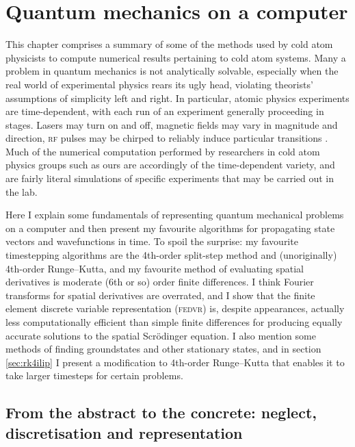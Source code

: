 \chapter{Quantum mechanics on a computer}

This chapter comprises a summary of some of the methods used by cold atom physicists to compute numerical results pertaining to cold atom systems. Many a problem in quantum mechanics is not analytically solvable, especially when the real world of experimental physics rears its ugly head, violating theorists' assumptions of simplicity left and right. In particular, atomic physics experiments are time-dependent, with each run of an experiment generally proceeding in stages. Lasers may turn on and off, magnetic fields may vary in magnitude and direction, \textsc{rf} pulses may be chirped to reliably induce particular transitions \cite{bennie_precise_2014}. Much of the numerical computation performed by researchers in cold atom physics groups such as ours are accordingly of the time-dependent variety, and are fairly literal simulations of specific experiments that may be carried out in the lab.

Here I explain some fundamentals of representing quantum mechanical problems on a computer and then present my favourite algorithms for propagating state vectors and wavefunctions in time. To spoil the surprise: my favourite timestepping algorithms are the 4th-order split-step method and (unoriginally) 4th-order Runge--Kutta, and my favourite method of evaluating spatial derivatives is moderate (6th or so) order finite differences. I think Fourier transforms for spatial derivatives are overrated, and I show that the finite element discrete variable representation (\textsc{fedvr}) is, despite appearances, actually less computationally efficient than simple finite differences for producing equally accurate solutions to the spatial Scr\"odinger equation. I also mention some methods of finding groundstates and other stationary states, and in section \ref{sec:rk4ilip} I present a modification to 4th-order Runge--Kutta that enables it to take larger timesteps for certain problems.

\section{From the abstract to the concrete: neglect, discretisation and representation}\label{sec:neglect_discretisation}

